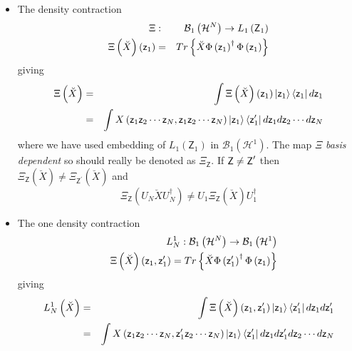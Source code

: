 \documentclass[aps,preprint]{revtex4}
\begin{document}
\begin{description}
\item 
\begin{itemize}
\item The density contraction%
\begin{eqnarray}
\Xi &:&\mathcal{B}_{1}\left( \mathcal{H}^{N}\right) \rightarrow L_{1}\left( 
\mathsf{Z}_{1}\right)  \notag \\
\Xi \left( \breve{X}\right) \left( \mathsf{z}_{1}\right) &=&Tr\left\{ \breve{%
X}\Phi \left( \mathsf{z}_{1}\right) ^{\dagger }\Phi \left( \mathsf{z}%
_{1}\right) \right\}  \label{d0}
\end{eqnarray}%
giving 
\begin{eqnarray}
\Xi \left( \breve{X}\right) &=&\int \Xi \left( \breve{X}\right) \left( 
\mathsf{z}_{1}\right) \left\vert \mathsf{z}_{1}\right\rangle \left\langle 
\mathsf{z}_{1}\right\vert d\mathsf{z}_{1}  \notag \\
&=&\int X\left( \mathsf{z}_{1}\mathsf{z}_{2}\cdots \mathsf{z}_{N},\mathsf{z}%
_{1}\mathsf{z}_{2}\cdots \mathsf{z}_{N}\right) \left\vert \mathsf{z}%
_{1}\right\rangle \left\langle \mathsf{z}_{1}^{\prime }\right\vert d\mathsf{z%
}_{1}d\mathsf{z}_{2}\cdots d\mathsf{z}_{N}
\end{eqnarray}%
where we have used embedding of $L_{1}\left( \mathsf{Z}_{1}\right) $ in $%
\mathcal{B}_{1}\left( \mathcal{H}^{1}\right) $. The map $\Xi $ \emph{basis
dependent }so should really be denoted as $\Xi _{\mathsf{Z}}$. If $\mathsf{%
Z\neq Z}^{\prime }$ then $\Xi _{\mathsf{Z}}\left( \breve{X}\right) \neq \Xi
_{\mathsf{Z}^{\prime }}\left( \breve{X}\right) $ and 
\begin{equation}
\Xi _{\mathsf{Z}}\left( U_{N}\breve{X}U_{N}^{\dagger }\right) \neq U_{1}\Xi
_{\mathsf{Z}}\left( \breve{X}\right) U_{1}^{\dagger }
\end{equation}

\item The one density contraction 
\begin{eqnarray}
&&L_{N}^{1}:\mathcal{B}_{1}\left( \mathcal{H}^{N}\right) \rightarrow 
\mathcal{B}_{1}\left( \mathcal{H}^{1}\right)  \notag \\
&&\Xi \left( \breve{X}\right) \left( \mathsf{z}_{1},\mathsf{z}_{1}^{\prime
}\right) =Tr\left\{ \breve{X}\Phi \left( \mathsf{z}_{1}^{\prime }\right)
^{\dagger }\Phi \left( \mathsf{z}_{1}\right) \right\}
\end{eqnarray}%
giving 
\begin{eqnarray}
L_{N}^{1}\left( \breve{X}\right) &=&\int \Xi \left( \breve{X}\right) \left( 
\mathsf{z}_{1},\mathsf{z}_{1}^{\prime }\right) \left\vert \mathsf{z}%
_{1}\right\rangle \left\langle \mathsf{z}_{1}^{\prime }\right\vert d\mathsf{z%
}_{1}d\mathsf{z}_{1}^{\prime }  \notag \\
\left. {}\right. \qquad &=&\int X\left( \mathsf{z}_{1}\mathsf{z}_{2}\cdots 
\mathsf{z}_{N},\mathsf{z}_{1}^{\prime }\mathsf{z}_{2}\cdots \mathsf{z}%
_{N}\right) \left\vert \mathsf{z}_{1}\right\rangle \left\langle \mathsf{z}%
_{1}^{\prime }\right\vert d\mathsf{z}_{1}d\mathsf{z}_{1}^{\prime }d\mathsf{z}%
_{2}\cdots d\mathsf{z}_{N}
\end{eqnarray}


\end{itemize}
\end{description}
\end{document}
